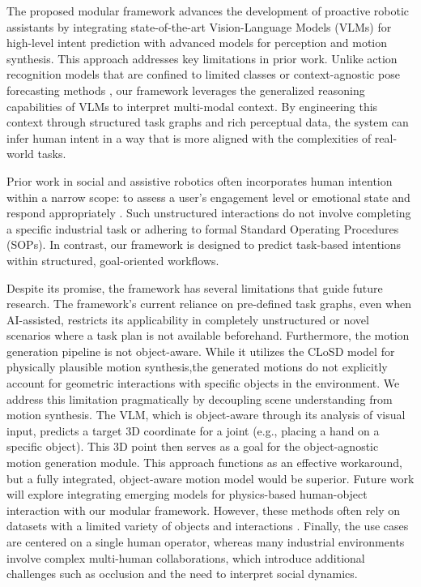 \documentclass[biomimetics,article,submit,pdftex,moreauthors]{Definitions/mdpi}
\begin{document}
The proposed modular framework advances the development of proactive robotic assistants by integrating state-of-the-art Vision-Language Models (VLMs) for high-level intent prediction with advanced models for perception and motion synthesis. This approach addresses key limitations in prior work. Unlike action recognition models that are confined to limited classes \citep{FutureTransformer, dexfocus} or context-agnostic pose forecasting methods \citep{STSGCN, transfusion}, our framework leverages the generalized reasoning capabilities of VLMs to interpret multi-modal context. 
By engineering this context through structured task graphs and rich perceptual data, the system can infer human intent in a way that is more aligned with the complexities of real-world tasks.

Prior work in social and assistive robotics often incorporates human intention within a narrow scope: to assess a user's engagement level \citep{Bi2023} or emotional state and respond appropriately \citep{Scassellati2002}. Such unstructured interactions do not involve completing a specific industrial task or adhering to formal Standard Operating Procedures (SOPs). In contrast, our framework is designed to predict task-based intentions within structured, goal-oriented workflows.

Despite its promise, the framework has several limitations that guide future research. The framework's current reliance on pre-defined task graphs, even when AI-assisted, restricts its applicability in completely unstructured or novel scenarios where a task plan is not available beforehand. Furthermore, the motion generation pipeline is not object-aware. While it utilizes the CLoSD model \citep{tevet2024closd} for physically plausible motion synthesis,the generated motions do not explicitly account for geometric interactions with specific objects in the environment. We address this limitation pragmatically by decoupling scene understanding from motion synthesis. The VLM, which is object-aware through its analysis of visual input, predicts a target 3D coordinate for a joint (e.g., placing a hand on a specific object). This 3D point then serves as a goal for the object-agnostic motion generation module. This approach functions as an effective workaround, but a fully integrated, object-aware motion model would be superior. Future work will explore integrating emerging models for physics-based human-object interaction with our modular framework. However, these methods often rely on datasets with a limited variety of objects and interactions \citep{intermimic, hot3d, arctic}. Finally, the use cases are centered on a single human operator, whereas many industrial environments involve complex multi-human collaborations, which introduce additional challenges such as occlusion and the need to interpret social dynamics.
\end{document}
